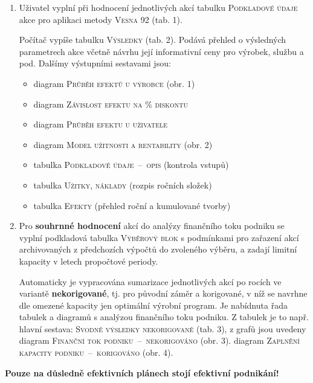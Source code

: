 \documentclass [10pt, fancyhdr, twoside] {article}
\begin{document}
\begin{enumerate}
\item Uživatel vyplní při hodnocení jednotlivých akcí tabulku \textsc{Podkladové údaje} akce pro aplikaci metody \textsc{Vesna} 92 (tab. 1).

Počítač vypíše tabulku \textsc{Výsledky} (tab. 2). Podává přehled o výsledných parametrech akce včetně návrhu její informativní ceny pro výrobek, službu a pod. Dalšímy výstupními sestavami jsou:

\begin{itemize}
\item diagram \textsc{Průběh efektů u výrobce} (obr. 1)
\item diagram \textsc{Závislost efektu na \% diskontu}
\item diagram \textsc{Průběh efektu u uživatele}
\item diagram \textsc{Model užitnosti a rentability} (obr. 2)
\item tabulka \textsc{Podkladové údaje~–~opis} (kontrola vstupů)
\item tabulka \textsc{Užitky, náklady} (rozpis ročních složek)
\item tabulka \textsc{Efekty} (přehled roční a kumulované tvorby)
\end{itemize}

\item Pro \textbf{souhrnné hodnocení} akcí do analýzy finančního toku podniku se vyplní podkladová tabulka \textsc{Výběrový blok} s podmínkami pro zařazení akcí archivovaných z předchozích výpočtů do zvoleného výběru, a zadají limitní kapacity v letech propočtové periody.

Automaticky je vypracována sumarizace jednotlivých akcí po rocích ve variantě \textbf{nekorigované}, tj. pro původní záměr a korigované, v níž se navrhne dle omezené kapacity jen optimální výrobní program. Je nabídnuta řada tabulek a diagramů s analýzou finančního toku podniku. Z tabulek je to např. hlavní sestava: \textsc{Svodné výsledky nekorigované} (tab. 3), z grafů jsou uvedeny
diagram \textsc{Finanční tok podniku~–~nekorigováno} (obr. 3).
diagram \textsc{Zaplnění kapacity podniku~–~korigováno} (obr. 4).

\end{enumerate}

\begin{tcolorbox}

\textbf{Pouze na důsledně efektivních plánech stojí efektivní podnikání!}
\end{tcolorbox}
\end{document}
